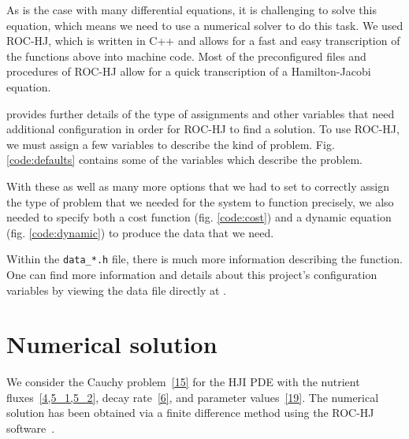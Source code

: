 \documentclass[11pt]{amsart}
\begin{document}
As is the case with many differential equations, it is challenging to solve
this equation, which means we need to use a numerical solver to do this task.
We used ROC-HJ, which is written in C++ and allows for a fast and easy
transcription of the functions above into machine code. Most of the
preconfigured files and procedures of ROC-HJ allow for a quick transcription
of a Hamilton-Jacobi equation.


\cite{ROCHJ2019} provides further details of the type of assignments and
other variables that need additional configuration in order for ROC-HJ to find
a solution. To use ROC-HJ, we must assign a few variables to describe the kind
of problem. Fig. \ref{code:defaults} contains some of the variables which
describe the problem.



With these as well as many more options that we had to set to correctly assign
the type of problem that we needed for the system to function precisely, we
also needed to specify both a cost function (fig. \ref{code:cost}) and a
dynamic equation (fig. \ref{code:dynamic}) to produce the data that we need.


Within the \texttt{data\_*.h} file, there is much more information describing
the function. One can find more information and details about this project's
configuration variables by viewing the data file directly at \cite{data_ivan.h}.

\section{Numerical solution}

We consider the Cauchy problem~\cref{15} for the HJI PDE with the nutrient
fluxes~\cref{4,5_1,5_2}, decay rate~\cref{6}, and parameter values~\cref{19}.
The numerical solution has been obtained via a finite difference method
\cite{FlemingSoner2006,
      OsherShu1991,
      BotkinHoffmannTurova2011,
      BokanForcadelZidani2010}
using the ROC-HJ software~\cite{ROCHJ2019}.
\end{document}
